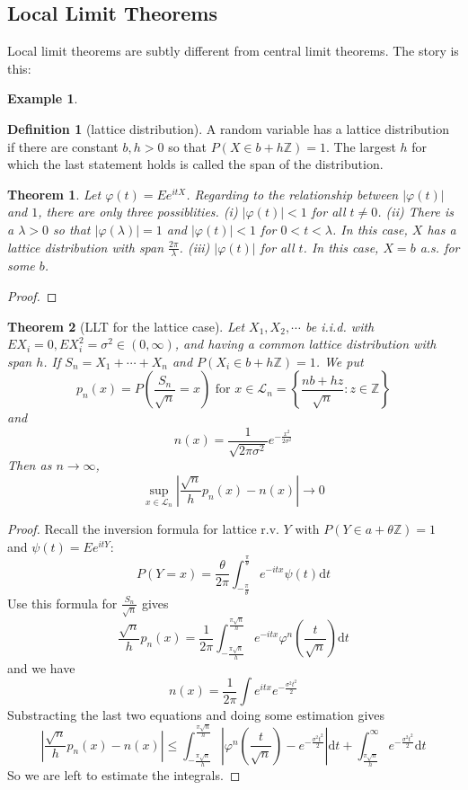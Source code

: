 \documentclass{article}
\newtheorem{Thm}{Theorem}[section]
\newtheorem{Eg}{Example}[section]
\theoremstyle{definition}
\newtheorem{Def}{Definition}[section]
\begin{document}
\subsection{Local Limit Theorems}
Local limit theorems are subtly different from central limit theorems. The story is this:
\begin{Eg}
    
\end{Eg}
\begin{Def}[lattice distribution]
    A random variable has a lattice distribution if there are constant $b,h>0$ so that $P(X\in b+h\mathbb{Z})=1$.
    The largest $h$ for which the last statement holds is called the span of the distribution.
\end{Def}
\begin{Thm}
    Let $\varphi(t)=Ee^{itX}$. Regarding to the relationship between $\left|\varphi(t)\right|$ and $1$, there are only three possiblities.\newline 
    (i) $\left|\varphi(t)\right|<1$ for all $t\ne 0$.\newline 
    (ii) There is a $\lambda>0$ so that $\left|\varphi(\lambda)\right|=1$ and $\left|\varphi(t)\right|<1$ for $0<t<\lambda$. In this case,
    $X$ has a lattice distribution with span $\frac{2\pi}{\lambda}$.\newline 
    (iii) $\left|\varphi(t)\right|$ for all $t$. In this case, $X=b$ a.s. for some $b$.
\end{Thm}
\begin{proof}
    
\end{proof}

\begin{Thm}[LLT for the lattice case]
    Let $X_1,X_2,\cdots$ be i.i.d. with $EX_i=0,EX_i^2=\sigma^2\in(0,\infty)$, and having a common lattice distribution with span $h$.
    If $S_n=X_1+\cdots+X_n$ and $P(X_i\in b+h\mathbb{Z})=1$. We put
    \[p_n(x)=P(\frac{S_n}{\sqrt{n}}=x)\text{  for  }x\in\mathcal{L}_n=\left\{\frac{nb+hz}{\sqrt{n}}:z\in\mathbb{Z}\right\}\] 
    and \[n(x)=\frac{1}{\sqrt{2\pi\sigma^2}}e^{-\frac{x^2}{2\sigma^2}}\] 
    Then as $n\to\infty$,\[\sup_{x\in\mathcal{L}_n}\left|\frac{\sqrt{n}}{h}p_n(x)-n(x)\right|\to 0\]
\end{Thm}
\begin{proof}
    Recall the inversion formula for lattice r.v. $Y$ with $P(Y\in a+\theta \mathbb{Z})=1$ and $\psi(t)=Ee^{itY}$:
    \[P(Y=x)=\frac{\theta}{2\pi}\int_{-\frac{\pi}{\theta}}^{\frac{\pi}{\theta}}e^{-itx}\psi(t)\mathrm{d}t\]
    Use this formula for $\frac{S_n}{\sqrt{n}}$ gives
    \[\frac{\sqrt{n}}{h}p_n(x)=\frac{1}{2\pi}\int_{-\frac{\pi\sqrt{n}}{h}}^{\frac{\pi\sqrt{n}}{h}}e^{-itx}\varphi^n(\frac{t}{\sqrt{n}})\mathrm{d}t\]
    and we have \[n(x)=\frac{1}{2\pi}\int e^{itx}e^{-\frac{\sigma^2t^2}{2}}\]
    Substracting the last two equations and doing some estimation gives 
    \[\left|\frac{\sqrt{n}}{h}p_n(x)-n(x)\right|\le \int_{-\frac{\pi\sqrt{n}}{h}}^{\frac{\pi\sqrt{n}}{h}}\left|\varphi^n(\frac{t}{\sqrt{n}})-e^{-\frac{\sigma^2t^2}{2}}\right|\mathrm{d}t+\int_{\frac{\pi\sqrt{n}}{h}}^\infty e^{-\frac{\sigma^2t^2}{2}}\mathrm{d}t\]
    So we are left to estimate the integrals.
\end{proof}
\end{document}
